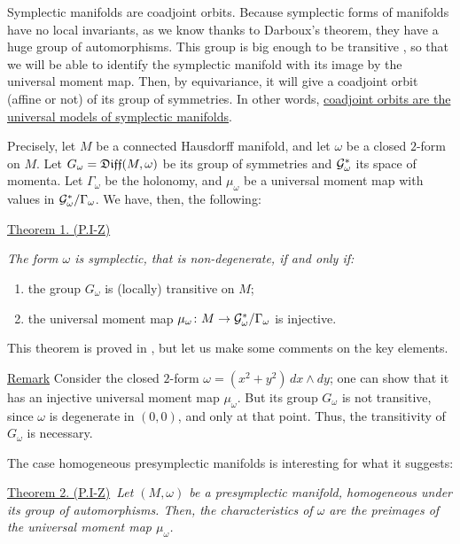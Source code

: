 \begin{Article}{Symplectic manifolds are coadjoint orbits.}{}
  Because symplectic forms of manifolds have no local invariants,
  as we know thanks to Darboux's theorem,
  they have a huge group of automorphisms.
  This group is big enough to be transitive \cite{Boo69},
  so that we will be able to identify the symplectic manifold with its image by the universal moment map.
  Then,
  by equivariance,
  it will give a coadjoint orbit (affine or not) of its group of symmetries.
  In other words,
  \uline{coadjoint orbits are the universal models of symplectic manifolds}.
  
  Precisely,
  let $M$ be a connected Hausdorff manifold,
  and let $\omega$ be a closed $2$-form on $M$.
  Let $G_\omega = \mathfrak{Diff}(M, \omega)$ be its group of symmetries and $\mathcal{G}^*_\omega$ its space of momenta.
  Let $\Gamma_\omega$ be the holonomy,
  and $\mu_\omega$ be a universal moment map with values in $\mathcal{G}^*_\omega/\Gamma_\omega$.
  We have,
  then,
  the following:
  
  \uline{Theorem 1. (P.I-Z)}~{\itshape The form $\omega$ is symplectic,
  that is non-degenerate,
  if and only if:
  \begin{enumerate}
    \item[1.] the group $G_\omega$ is (locally) transitive on $M$;
    \item[2.] the  universal moment map $\mu_\omega \colon M \to \mathcal{G}^*_\omega/\Gamma_\omega$ is injective.
  \end{enumerate}
  }
  
  This theorem is proved in \cite[\textsection\,9.23]{PIZ13},
  but let us make some comments on the key elements.
  
  \uline{Remark} Consider the closed $2$-form $\omega = (x^2 + y^2) \, dx \wedge dy$;
  one can show that it has an injective universal moment map $\mu_\omega$.
  But its group $G_\omega$ is not transitive,
  since $\omega$ is degenerate in $(0,0)$,
  and only at that point.
  Thus,
  the transitivity of $G_\omega$ is necessary.
  
  The case homogeneous presymplectic manifolds is interesting for what it suggests:
  
  \uline{Theorem 2. (P.I-Z)}~{\itshape Let $(M,\omega)$ be a presymplectic manifold,
  homogeneous under its group of automorphisms.
  Then,
  the characteristics of $\omega$ are the preimages of the universal moment map $\mu_\omega$.}
\end{Article}

